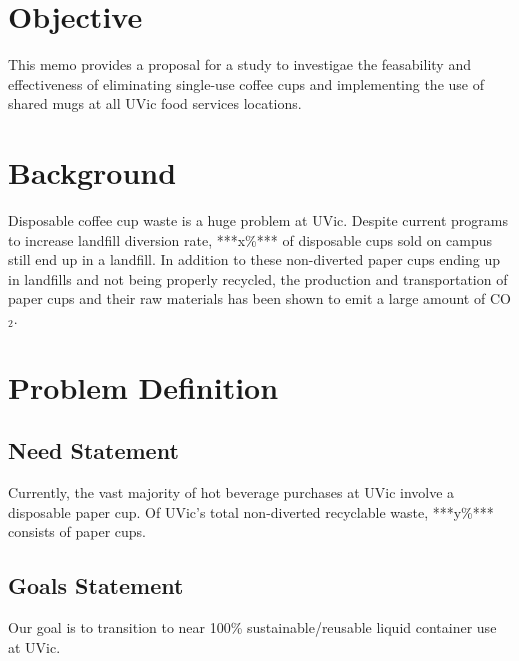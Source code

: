 \documentclass[letterpaper,11pt]{texMemo} %
\begin{document}
\maketitle %


\section*{Objective}
This memo provides a proposal for a study to investigae the feasability and
effectiveness of eliminating single-use coffee cups and implementing the
use of shared mugs at all UVic food services
locations.
\section*{Background}
Disposable coffee cup waste is a huge problem at UVic. Despite current programs
to increase landfill diversion rate, ***x\%*** of disposable cups sold on campus
still end up in a landfill.\cite{myrefitem} In addition to these non-diverted
paper cups ending up in landfills and not being properly recycled, the
production and transportation of paper cups and their raw materials has been
shown to emit a large amount of CO$_{2}$.\cite{papercupemissions}
\section*{Problem Definition}
\subsection*{Need Statement}
Currently, the vast majority of hot beverage purchases at UVic involve a
disposable paper cup.%
Of UVic's total non-diverted recyclable waste, ***y\%*** consists of paper
cups. %
\subsection*{Goals Statement}
Our goal is to transition to near 100\% sustainable/reusable liquid container
use at UVic.
\end{document}
